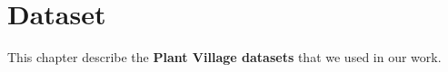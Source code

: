  
\chapter{Dataset}

This chapter describe the \textbf{Plant Village datasets} that we used in our work.\par\vspace{1em}






